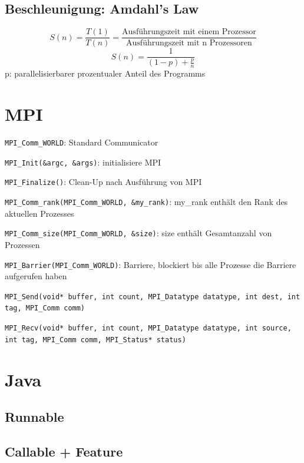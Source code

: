 \subsection{Beschleunigung: Amdahl's Law }
$$S(n) = \frac{T(1)}{T(n)}=\frac{\text{Ausführungszeit mit einem Prozessor}}{\text{Ausführungszeit mit n Prozessoren}}$$
$$S(n)= \frac{1}{(1-p)+ \frac{p}{n}}$$
p: parallelisierbarer prozentualer Anteil des Programms

\section{MPI}
\begin{compactitem}
	\item \texttt{MPI\_Comm\_WORLD}: Standard Communicator	
	\item \texttt{MPI\_Init(\&argc, \&args)}: initialisiere MPI
	\item \texttt{MPI\_Finalize()}: Clean-Up nach Ausführung von MPI
	\item \texttt{MPI\_Comm\_rank(MPI\_Comm\_WORLD, \&my\_rank)}: my\_rank enthält den Rank des aktuellen Prozesses
	\item \texttt{MPI\_Comm\_size(MPI\_Comm\_WORLD, \&size)}: size enthält Gesamtanzahl von Prozessen
	\item \texttt{MPI\_Barrier(MPI\_Comm\_WORLD)}: Barriere, blockiert bis alle Prozesse die Barriere aufgerufen haben
	\item \texttt{MPI\_Send(void* buffer, int count, MPI\_Datatype datatype, int dest, int tag, MPI\_Comm comm)}
	\item \texttt{MPI\_Recv(void* buffer, int count, MPI\_Datatype datatype, int source, int tag, MPI\_Comm comm, MPI\_Status* status)}
\end{compactitem}

\newpage
\section{Java}
\subsection{Runnable}
\label{javaRunnable}


\newpage
\subsection{Callable + Feature}
\label{javaRunnable}


